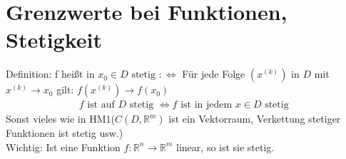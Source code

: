 \section{Grenzwerte bei Funktionen, Stetigkeit}
Definition: f heißt in $x_0 \in D \text{ stetig }: \Leftrightarrow$ Für jede Folge $(x^{(k)})$ in $D$ mit $x^{(k)} \to x_0$ gilt: 
$f(x^{(k)}) \to f(x_0)$ \\
\begin{align*}
    f \text{ ist auf } D \text{ stetig } \Leftrightarrow f \text{ ist in jedem } x \in D \text{ stetig }
\end{align*}
Sonst vieles wie in HM1($C(D,\mathbb{R}^m)$ ist ein Vektorraum, Verkettung stetiger Funktionen ist stetig usw.) \\
Wichtig: Ist eine Funktion $f: \mathbb{R}^n \to \mathbb{R}^m$ linear, so ist sie stetig.